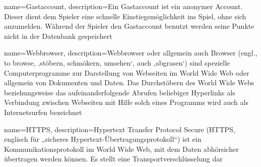 
{
    name=Gastaccount,
    description={Ein Gastaccount ist ein anonymer Account. Dieser dient dem Spieler eine schnelle Einstiegsmöglichkeit ins Spiel, ohne sich anzumelden. Während der Spieler den Gastaccount benutzt werden seine Punkte nicht in der Datenbank gespeichert}
}

{
    name=Webbrowser,
    description={Webbrowser oder allgemein auch Browser (engl., to browse, ‚stöbern, schmökern, umsehen‘, auch ‚abgrasen‘) sind spezielle Computerprogramme zur Darstellung von Webseiten im World Wide Web oder allgemein von Dokumenten und Daten. Das Durchstöbern des World Wide Webs beziehungsweise das aufeinanderfolgende Abrufen beliebiger Hyperlinks als Verbindung zwischen Webseiten mit Hilfe solch eines Programms wird auch als Internetsurfen bezeichnet}
}

{
    name=HTTPS,
    description={Hypertext Transfer Protocol Secure (HTTPS, englisch für „sicheres Hypertext-Übertragungsprotokoll“) ist ein Kommunikationsprotokoll im World Wide Web, mit dem Daten abhörsicher übertragen werden können. Es stellt eine Transportverschlüsselung dar}
}

